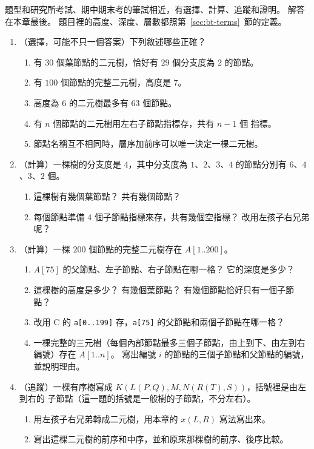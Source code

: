 題型和研究所考試、期中期末考的筆試相近，有選擇、計算、追蹤和證明。 解答在本章最後。
題目裡的高度、深度、層數都照第~\ref{sec:bt-terms}~節的定義。

\begin{enumerate}
\item （選擇，可能不只一個答案）下列敘述哪些正確？
\begin{enumerate}
\item 有 $30$ 個葉節點的二元樹，恰好有 $29$ 個分支度為 $2$ 的節點。
\item 有 $100$ 個節點的完整二元樹，高度是 $7$。
\item 高度為 $6$ 的二元樹最多有 $63$ 個節點。
\item 有 $n$ 個節點的二元樹用左右子節點指標存，共有 $n - 1$ 個 \NIL 指標。
\item 節點名稱互不相同時，層序加前序可以唯一決定一棵二元樹。
\end{enumerate}

\item （計算）一棵樹的分支度是 $4$，其中分支度為 $1$、$2$、$3$、$4$ 的節點分別有
$6$、$4$、$3$、$2$ 個。
\begin{enumerate}
\item 這棵樹有幾個葉節點？ 共有幾個節點？
\item 每個節點準備 $4$ 個子節點指標來存，共有幾個空指標？ 改用左孩子右兄弟呢？
\end{enumerate}

\item （計算）一棵 $200$ 個節點的完整二元樹存在 $A[1..200]$。
\begin{enumerate}
\item $A[75]$ 的父節點、左子節點、右子節點在哪一格？ 它的深度是多少？
\item 這棵樹的高度是多少？ 有幾個葉節點？ 有幾個節點恰好只有一個子節點？
\item 改用 C 的 \texttt{a[0..199]} 存，\texttt{a[75]} 的父節點和兩個子節點在哪一格？
\item 一棵完整的三元樹（每個內部節點最多三個子節點，由上到下、由左到右編號）存在
$A[1..n]$。 寫出編號 $i$ 的節點的三個子節點和父節點的編號，並說明理由。
\end{enumerate}

\item \label{q:bt-convert}（追蹤）一棵有序樹寫成 $K(L(P, Q), M, N(R(T), S))$，括號裡是由左到右的
子節點（這一題的括號是一般樹的子節點，不分左右）。
\begin{enumerate}
\item 用左孩子右兄弟轉成二元樹，用本章的 $x(L, R)$ 寫法寫出來。
\item 寫出這棵二元樹的前序和中序，並和原來那棵樹的前序、後序比較。
\end{enumerate}


\end{enumerate}
